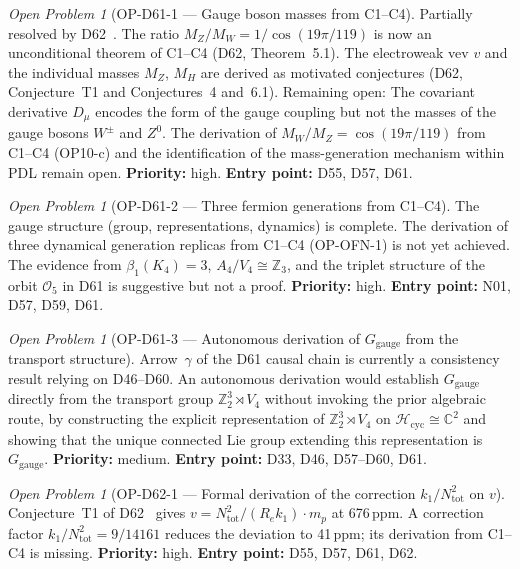 \documentclass[11pt,a4paper]{article}
\theoremstyle{plain}
\theoremstyle{definition}
\theoremstyle{remark}
\newtheorem{openproblem}[theorem]{Open Problem}
\begin{document}
\begin{openproblem}[OP-D61-1 --- Gauge boson masses from C1--C4] \textcolor{proofblue}{Partially resolved by D62~\cite{D62}.} The ratio $M_Z/M_W = 1/\cos(19\pi/119)$ is now an unconditional theorem of C1--C4 (D62, Theorem~5.1). The electroweak vev $v$ and the individual masses $M_Z$, $M_H$ are derived as motivated conjectures (D62, Conjecture~T1 and Conjectures~4 and~6.1). Remaining open:
\label{op:D61one}
The covariant derivative $D_\mu$ encodes the form of the gauge coupling but not the masses of the gauge bosons $W^\pm$ and $Z^0$. The derivation of $M_W/M_Z = \cos(19\pi/119)$ from C1--C4 (OP10-c) and the identification of the mass-generation mechanism within PDL remain open. \textbf{Priority:} high. \textbf{Entry point:} D55, D57, D61.
\end{openproblem}

\begin{openproblem}[OP-D61-2 --- Three fermion generations from C1--C4]
\label{op:D61two}
The gauge structure (group, representations, dynamics) is complete. The derivation of three dynamical generation replicas from C1--C4 (OP-OFN-1) is not yet achieved. The evidence from $\beta_1(K_4) = 3$, $A_4/V_4 \cong \mathbb{Z}_3$, and the triplet structure of the orbit $\mathcal{O}_5$ in D61 is suggestive but not a proof. \textbf{Priority:} high. \textbf{Entry point:} N01, D57, D59, D61.
\end{openproblem}

\begin{openproblem}[OP-D61-3 --- Autonomous derivation of $G_\mathrm{gauge}$ from the transport structure]
\label{op:D61three}
Arrow~$\gamma$ of the D61 causal chain is currently a consistency result relying on D46--D60. An autonomous derivation would establish $G_\mathrm{gauge}$ directly from the transport group $\mathbb{Z}_2^3 \rtimes V_4$ without invoking the prior algebraic route, by constructing the explicit representation of $\mathbb{Z}_2^3 \rtimes V_4$ on $\mathcal{H}_\mathrm{cyc} \cong \mathbb{C}^2$ and showing that the unique connected Lie group extending this representation is $G_\mathrm{gauge}$. \textbf{Priority:} medium. \textbf{Entry point:} D33, D46, D57--D60, D61.
\end{openproblem}

\begin{openproblem}[OP-D62-1 --- Formal derivation of the correction $k_1/N_{\mathrm{tot}}^2$ on $v$]
\label{op:D62one}
Conjecture~T1 of D62~\cite{D62} gives $v = N_{\mathrm{tot}}^2/(R_e k_1)\cdot m_p$ at 676\,ppm. A correction factor $k_1/N_{\mathrm{tot}}^2 = 9/14161$ reduces the deviation to 41\,ppm; its derivation from C1--C4 is missing. \textbf{Priority:} high. \textbf{Entry point:} D55, D57, D61, D62.
\end{openproblem}
\end{document}
